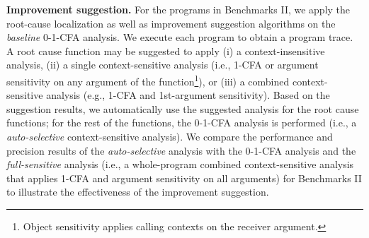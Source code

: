 

{\bf Improvement suggestion.} For the programs in Benchmarks II, we apply the root-cause localization as well as improvement suggestion algorithms on the {\it baseline} 0-1-CFA analysis. We execute each program to obtain a program trace. A root cause function may be suggested to apply (i) a context-insensitive analysis, (ii) a single context-sensitive analysis (i.e., 1-CFA or argument sensitivity on any argument of the function\footnote{Object sensitivity \cite{Milanova:2005:POS:1044834.1044835} applies calling contexts on the receiver argument.}), or (iii) a combined context-sensitive analysis (e.g., 1-CFA and 1st-argument sensitivity). Based on the suggestion results, we automatically use the suggested analysis for the root cause functions; for the rest of the functions, the 0-1-CFA analysis is performed (i.e., a {\it auto-selective} context-sensitive analysis). We compare the performance and precision results of the {\it auto-selective} analysis with the 0-1-CFA analysis and the {\it full-sensitive} analysis (i.e., a whole-program combined context-sensitive analysis that applies 1-CFA and argument sensitivity on all arguments) for Benchmarks II to illustrate the effectiveness of the improvement suggestion.

